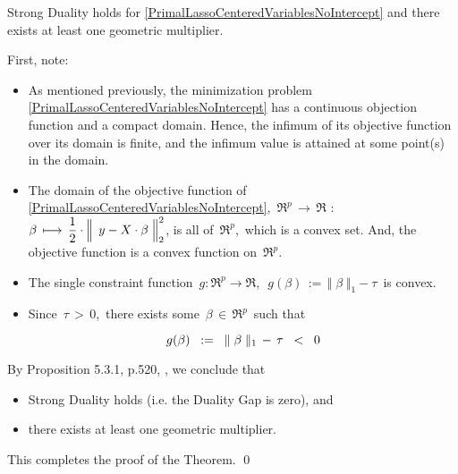 \vskip 0.5cm
\begin{theorem}
\label{LassoStrongDuality}
\mbox{}
\vskip 0.1cm
\noindent
Strong Duality holds for \eqref{PrimalLassoCenteredVariablesNoIntercept}
and there exists at least one geometric multiplier.
\end{theorem}
\proof
First, note:
\begin{itemize}
\item
	As mentioned previously, the minimization problem \eqref{PrimalLassoCenteredVariablesNoIntercept}
	has a continuous objection function and a compact domain.
	Hence, the infimum of its objective function over its domain is finite,
	and the infimum value is attained at some point(s) in the domain.
\item
	The domain of the objective function of \eqref{PrimalLassoCenteredVariablesNoIntercept},
	\,$\Re^{p} \,\longrightarrow\, \Re$
	$:$
	$\beta \,\longmapsto\, \dfrac{1}{2}\cdot\left\Vert\;\,y \overset{{\color{white}.}}{-} X\cdot\beta\;\right\Vert^{2}_{2}$\;,\;
	is all of \,$\Re^{p}$,\, which is a convex set.
	And, the objective function is a convex function on \,$\Re^{p}$.
\item
	The single constraint function
	\,$g : \Re^{p} \longrightarrow \Re$,\,
	\,$g(\beta) \,:=\, \Vert\;\beta\;\Vert_{1} - \tau$\,
	is convex.
\item
	Since \,$\tau \,>\, 0$,\, there exists some \,$\beta \,\in\, \Re^{p}$\, such that
	\begin{equation*}
	g(\beta)
	\;\; := \;\;
		\Vert\;\overset{{\color{white}.}}{\beta} \;\Vert_{1} \, - \, \tau
	\;\; < \;\; 0
	\end{equation*}
\end{itemize}
By Proposition 5.3.1, p.520, \cite{Bertsekas1999}, we conclude that
\begin{itemize}
\item
	Strong Duality holds (i.e. the Duality Gap is zero), and
\item
	there exists at least one geometric multiplier.
\end{itemize}
This completes the proof of the Theorem.
\qed


